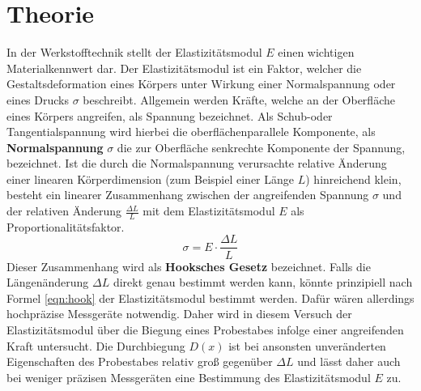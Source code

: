 \section{Theorie}
\label{sec:Theorie}

In der Werkstofftechnik stellt der Elastizitätsmodul $E$ einen wichtigen Materialkennwert dar.
Der Elastizitätsmodul ist ein Faktor, welcher die Gestaltsdeformation eines Körpers unter Wirkung einer Normalspannung oder eines Drucks $\sigma$ beschreibt.
Allgemein werden Kräfte, welche an der Oberfläche eines Körpers angreifen, als Spannung bezeichnet. Als Schub-oder Tangentialspannung wird hierbei die oberflächenparallele Komponente, als \textbf{Normalspannung} $\sigma$ die zur Oberfläche senkrechte Komponente der Spannung, bezeichnet.
Ist die durch die Normalspannung verursachte relative Änderung einer linearen Körperdimension (zum Beispiel einer Länge $L$) hinreichend klein,
besteht ein linearer Zusammenhang zwischen der angreifenden Spannung $\sigma$ und der relativen Änderung $\frac{\Delta L}{L}$ mit dem Elastizitätsmodul $E$ als Proportionalitätsfaktor.
\begin{equation}
	\label{eqn:hook}
	\sigma=E \cdot \frac{\Delta L}{L}
\end{equation}
Dieser Zusammenhang wird als \textbf{Hooksches Gesetz} bezeichnet.
Falls die Längenänderung $\Delta L$ direkt genau bestimmt werden kann, könnte prinzipiell nach Formel \eqref{eqn:hook} der Elastizitätsmodul bestimmt werden.
Dafür wären allerdings hochpräzise Messgeräte notwendig. Daher wird in diesem Versuch der Elastizitätsmodul über die Biegung eines Probestabes infolge einer angreifenden Kraft untersucht.
Die Durchbiegung $D(x)$ ist bei ansonsten unveränderten Eigenschaften des Probestabes relativ groß gegenüber $\Delta L$ und lässt daher auch bei weniger präzisen Messgeräten eine Bestimmung des Elastizitätsmodul $E$ zu.

